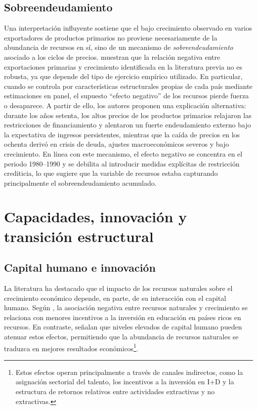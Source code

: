 \documentclass[../../TFM.tex]{subfiles}
\begin{document}
	\subsection{Sobreendeudamiento}
	\label{subsec:sobreendeudamiento}
	
	Una interpretación influyente sostiene que el bajo crecimiento observado en varios exportadores de productos primarios no proviene necesariamente de la abundancia de recursos en sí, sino de un mecanismo de \textit{sobreendeudamiento} asociado a los ciclos de precios. \textcite{Manzano2001} muestran que la relación negativa entre exportaciones primarias y crecimiento identificada en la literatura previa no es robusta, ya que depende del tipo de ejercicio empírico utilizado. En particular, cuando se controla por características estructurales propias de cada país mediante estimaciones en panel, el supuesto “efecto negativo” de los recursos pierde fuerza o desaparece. A partir de ello, los autores proponen una explicación alternativa: durante los años setenta, los altos precios de los productos primarios relajaron las restricciones de financiamiento y alentaron un fuerte endeudamiento externo bajo la expectativa de ingresos persistentes, mientras que la caída de precios en los ochenta derivó en crisis de deuda, ajustes macroeconómicos severos y bajo crecimiento. En línea con este mecanismo, el efecto negativo se concentra en el periodo 1980--1990 y se debilita al introducir medidas explícitas de restricción crediticia, lo que sugiere que la variable de recursos estaba capturando principalmente el sobreendeudamiento acumulado.
	
	\section{Capacidades, innovación y transición estructural}
	\label{sec:capacidades-innovacion}
	
	\subsection{Capital humano e innovación}
	\label{subsec:capital-humano-innovacion}
	
	La literatura ha destacado que el impacto de los recursos naturales sobre el crecimiento económico depende, en parte, de su interacción con el capital humano. Según \textcite{Gylfason2001}, la asociación negativa entre recursos naturales y crecimiento se relaciona con menores incentivos a la inversión en educación en países ricos en recursos. En contraste, \textcite{Bravo-Ortega2005} señalan que niveles elevados de capital humano pueden atenuar estos efectos, permitiendo que la abundancia de recursos naturales se traduzca en mejores resultados económicos\footnote{Estos efectos operan principalmente a través de canales indirectos, como la asignación sectorial del talento, los incentivos a la inversión en I+D y la estructura de retornos relativos entre actividades extractivas y no extractivas.}.
	
\end{document}
